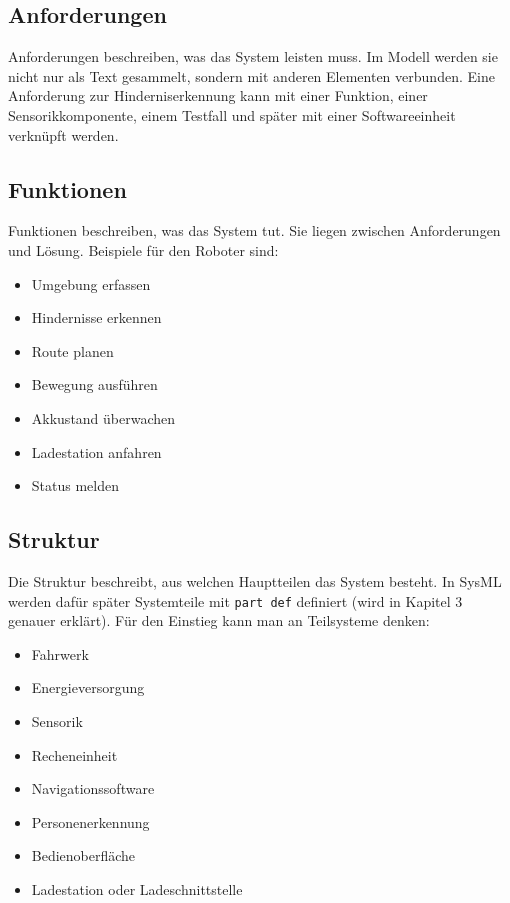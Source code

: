 \subsection{Anforderungen}
Anforderungen beschreiben, was das System leisten muss. Im Modell werden sie nicht nur als Text gesammelt, sondern mit anderen Elementen verbunden. Eine Anforderung zur Hinderniserkennung kann mit einer Funktion, einer Sensorikkomponente, einem Testfall und später mit einer Softwareeinheit verknüpft werden.

\subsection{Funktionen}
Funktionen beschreiben, was das System tut. Sie liegen zwischen Anforderungen und Lösung. Beispiele für den Roboter sind:

\begin{itemize}
    \item Umgebung erfassen
    \item Hindernisse erkennen
    \item Route planen
    \item Bewegung ausführen
    \item Akkustand überwachen
    \item Ladestation anfahren
    \item Status melden
\end{itemize}

\subsection{Struktur}
Die Struktur beschreibt, aus welchen Hauptteilen das System besteht. In SysML werden dafür später Systemteile mit \texttt{part def} definiert (wird in Kapitel 3 genauer erklärt). Für den Einstieg kann man an Teilsysteme denken:

\begin{itemize}
    \item Fahrwerk
    \item Energieversorgung
    \item Sensorik
    \item Recheneinheit
    \item Navigationssoftware
    \item Personenerkennung
    \item Bedienoberfläche
    \item Ladestation oder Ladeschnittstelle
\end{itemize}

